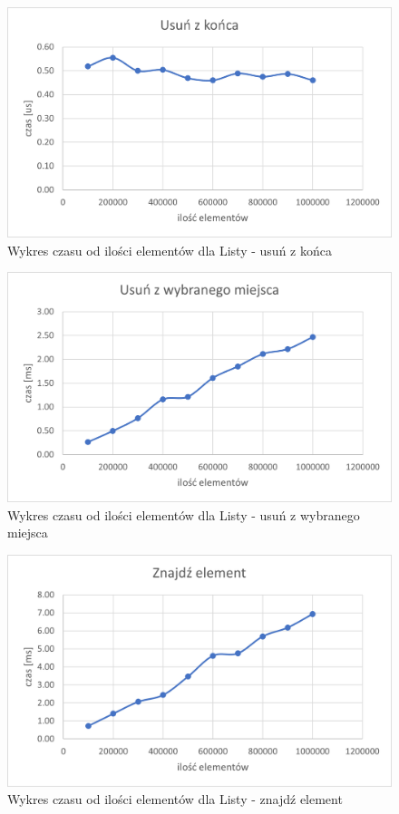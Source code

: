 \documentclass{article}
\begin{document}
    
    \begin{figure}[H]
        \centering
        \includegraphics[scale = 0.85]{wykresy/table/removeLast.png}
        \caption{Wykres czasu od ilości elementów dla Listy - usuń z końca}
    \end{figure}
    
    \begin{figure}[H]
        \centering
        \includegraphics[scale = 0.85]{wykresy/table/removeIndex.png}
        \caption{Wykres czasu od ilości elementów dla Listy - usuń z wybranego miejsca}
    \end{figure}
    
    \begin{figure}[H]
        \centering
        \includegraphics[scale = 0.85]{wykresy/table/find.png}
        \caption{Wykres czasu od ilości elementów dla Listy - znajdź element}
    \end{figure}  
\end{document}
